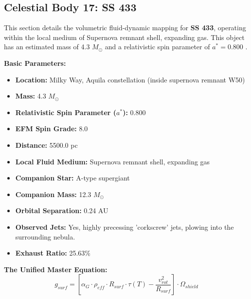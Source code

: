 \documentclass[11pt, a4paper]{article}
\begin{document}
\clearpage
\subsection{Celestial Body 17: SS 433}
This section details the volumetric fluid-dynamic mapping for \textbf{SS 433}, operating within the local medium of Supernova remnant shell, expanding gas. This object has an estimated mass of 4.3 $M_{\odot}$ and a relativistic spin parameter of $a^* = 0.800$ \cite{blundell2001, simbad}.

\vspace{0.5em}
\noindent \textbf{Basic Parameters:}
\begin{itemize}
  \item \textbf{Location:} Milky Way, Aquila constellation (inside supernova remnant W50)
  \item \textbf{Mass:} 4.3 $M_{\odot}$
  \item \textbf{Relativistic Spin Parameter ($a^*$):} 0.800
  \item \textbf{EFM Spin Grade:} 8.0
  \item \textbf{Distance:} 5500.0 pc
  \item \textbf{Local Fluid Medium:} Supernova remnant shell, expanding gas
  \item \textbf{Companion Star:} A-type supergiant
  \item \textbf{Companion Mass:} 12.3 $M_{\odot}$
  \item \textbf{Orbital Separation:} 0.24 AU
  \item \textbf{Observed Jets:} Yes, highly precessing 'corkscrew' jets, plowing into the surrounding nebula.
  \item \textbf{Exhaust Ratio:} 25.63\%
\end{itemize}

\vspace{0.5em}
\noindent \textbf{The Unified Master Equation:}
$$ g_{surf} = \left[ \alpha_G \cdot \rho_{eff} \cdot R_{surf} \cdot \tau(T) - \frac{v_{rot}^2}{R_{surf}} \right] \cdot \Omega_{shield} $$
\end{document}
